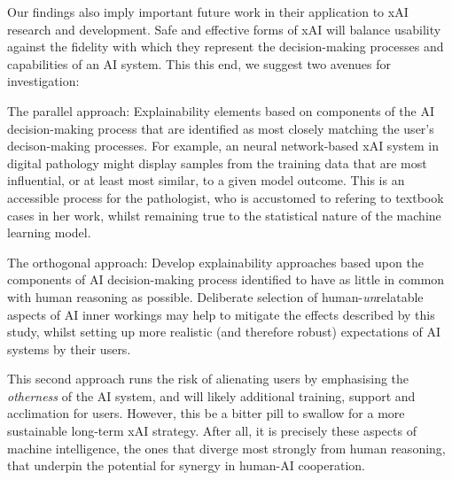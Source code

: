 Our findings also imply important future work in their application to xAI research and development. Safe and effective forms of xAI will balance usability against the fidelity with which they represent the decision-making processes and capabilities of an AI system. This this end, we suggest two avenues for investigation:

The parallel approach: Explainability elements based on components of the AI decision-making process that are identified as most closely matching the user's decison-making processes. For example, an neural network-based xAI system in digital pathology might display samples from the training data that are most influential, or at least most similar, to a given model outcome. This is an accessible process for the pathologist, who is accustomed to refering to textbook cases in her work, whilst remaining true to the statistical nature of the machine learning model.

The orthogonal approach: Develop explainability approaches based upon the components of AI decision-making process identified to have as little in common with human reasoning as possible. Deliberate selection of human-\textit{un}relatable aspects of AI inner workings may help to mitigate the effects described by this study, whilst setting up more realistic (and therefore robust) expectations of AI systems by their users. 

This second approach runs the risk of alienating users by emphasising the \textit{otherness} of the AI system, and will likely additional training, support and acclimation for users. However, this be a bitter pill to swallow for a more sustainable long-term xAI strategy. After all, it is precisely these aspects of machine intelligence, the ones that diverge most strongly from human reasoning, that underpin the potential for synergy in human-AI cooperation.
